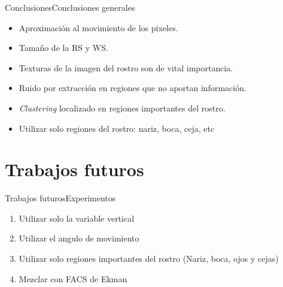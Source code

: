 \documentclass{beamer}
\begin{document}
	\begin{frame}{Conclusiones}{Conclusiones generales}
		\begin{itemize}
			\item Aproximación al movimiento de los pixeles.
			\item Tamaño de la RS y WS.
			\item Texturas de la imagen del rostro son de vital importancia.
			\item Ruido por extracción en regiones que no aportan información.
			\item \textit{Clustering} localizado en regiones importantes del rostro.
			\item Utilizar solo regiones del rostro: nariz, boca, ceja, etc
			
		\end{itemize}
	\end{frame}      

\section{Trabajos futuros}
        \begin{frame}{Trabajos futuros}{Experimentos}
			\begin{enumerate}
				\item Utilizar solo la variable vertical
				\item Utilizar el angulo de movimiento
				\item Utilizar solo regiones importantes del rostro (Nariz, boca, ojos y cejas)
				\item Mezclar con FACS de Ekman
			\end{enumerate}					        
        \end{frame}
    

\end{document}
